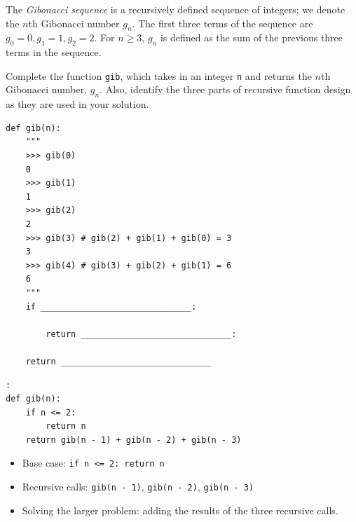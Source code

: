 \begin{blocksection}
\question The \textit{Gibonacci sequence} is a recursively defined sequence of integers; we denote the $n$th Gibonacci number $g_n$. The first three terms of the sequence are $g_0 = 0, g_1 = 1, g_2 = 2$. For $n \geq 3$, $g_n$ is defined as the sum of the previous three terms in the sequence. 

Complete the function \lstinline{gib}, which takes in an integer \lstinline{n} and returns the $n$th Gibonacci number, $g_n$. Also, identify the three parts of recursive function design as they are used in your solution. 

\begin{lstlisting}
def gib(n):
    """
    >>> gib(0)
    0
    >>> gib(1)
    1
    >>> gib(2)
    2
    >>> gib(3) # gib(2) + gib(1) + gib(0) = 3
    3
    >>> gib(4) # gib(3) + gib(2) + gib(1) = 6
    6
    """
    if ______________________________:

        return ______________________________:
        
    return ______________________________
\end{lstlisting}

\begin{solution}[0in]
\begin{lstlisting}:
def gib(n):
    if n <= 2:
        return n
    return gib(n - 1) + gib(n - 2) + gib(n - 3)
\end{lstlisting}

\begin{itemize}
    \item Base case: \lstinline{if n <= 2: return n}
    \item Recursive calls: \lstinline{gib(n - 1)}, \lstinline{gib(n - 2)}, \lstinline{gib(n - 3)}
    \item Solving the larger problem: adding the results of the three recursive calls. 
\end{itemize}
\end{solution}
\end{blocksection}

